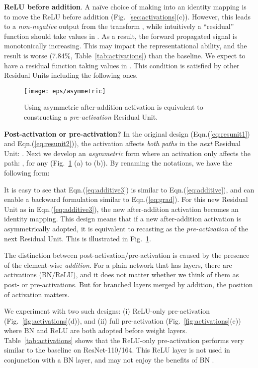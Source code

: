 \documentclass[runningheads]{llncs}
\begin{document}
\textbf{ReLU before addition}. A na\"{i}ve choice of making  into an identity mapping is to move the ReLU before addition (Fig.~\ref{sec:activations}(c)). However, this leads to a \emph{non-negative} output from the transform , while intuitively a ``residual'' function should take values in . As a result, the forward propagated signal is monotonically increasing. This may impact the representational ability, and the result is worse (7.84\%, Table~\ref{tab:activations}) than the baseline.
We expect to have a residual function taking values in . This condition is satisfied by other Residual Units including the following ones.

\begin{figure}[t]
\centering
\texttt{[image: eps/asymmetric]}
\caption{Using asymmetric after-addition activation is equivalent to constructing a \emph{pre-activation} Residual Unit.}
\label{fig:asymmetric}
\end{figure}

\textbf{Post-activation or pre-activation?}
In the original design (Eqn.(\ref{eq:resunit1}) and Eqn.(\ref{eq:resunit2})), the activation  affects \emph{both paths} in the \emph{next} Residual Unit: .
Next we develop an \emph{asymmetric} form where an activation  only affects the  path: , for any  (Fig.~\ref{fig:asymmetric} (a) to (b)). By renaming the notations, we have the following form:

It is easy to see that Eqn.(\ref{eq:additive3}) is similar to Eqn.(\ref{eq:additive}), and can enable a backward formulation similar to Eqn.(\ref{eq:grad}). For this new Residual Unit as in Eqn.(\ref{eq:additive3}), the new after-addition activation becomes an identity mapping.
This design means that if a new after-addition activation  is asymmetrically adopted, it is equivalent to recasting  as the \emph{pre-activation} of the next Residual Unit. This is illustrated in Fig.~\ref{fig:asymmetric}.

The distinction between post-activation/pre-activation is caused by the presence of the element-wise \emph{addition}. For a plain network that has  layers, there are  activations (BN/ReLU), and it does not matter whether we think of them as post- or pre-activations. But for branched layers merged by addition, the position of activation matters.



We experiment with two such designs: (i) ReLU-only pre-activation (Fig.~\ref{fig:activations}(d)), and (ii) full pre-activation (Fig.~\ref{fig:activations}(e)) where BN and ReLU are both adopted before weight layers. Table~\ref{tab:activations} shows that the ReLU-only pre-activation performs very similar to the baseline on ResNet-110/164. This ReLU layer is not used in conjunction with a BN layer, and may not enjoy the benefits of BN \cite{Ioffe2015}.
\end{document}
